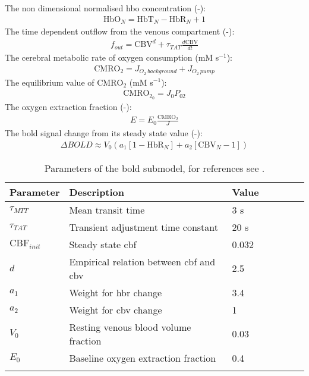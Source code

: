 \documentclass[11pt]{elsarticle}
\newcommand{\psec}{s$^{-1}$\xspace}
\begin{document}
The non dimensional normalised \gls{hbo} concentration (-):
\begin{align}
\text{HbO}_N = \text{HbT}_N - \text{HbR}_N + 1
\end{align}
%
The time dependent outflow from the venous compartment (-):
\begin{align}
f_{out} = \text{CBV}^{d} + \tau_{TAT} \frac{d \text{CBV}}{dt}
\end{align}
%	
The cerebral metabolic rate of oxygen consumption (mM \psec):
\begin{align}
\text{CMRO}_2 = J_{O_2 \: background} + J_{O_2 \: pump}
\end{align}
%	
The equilibrium value of $\text{CMRO}_2$ (mM \psec):
\begin{align}
\text{CMRO}_{2_0} =  J_0 P_{02}
\end{align}
%	
The oxygen extraction fraction (-):
\begin{align}
E = E_0\frac{\text{CMRO}_2}{J}
\end{align}
%
The \gls{bold} signal change from its steady state value (-):
\begin{align}
\Delta BOLD \approx V_0 \left( a_1 \left[ 1 - \text{HbR}_N \right] + a_2 \left[ \text{CBV}_N - 1 \right] \right) 
\label{eq:bold}
\end{align}
\xspace
%	
\begin{longtable}[h!]{ p{0.12\linewidth}   p{0.6\linewidth}   p{0.28\linewidth} }
	\hline
	Parameter & Description & Value \\
	\hline
	$\tau_{MTT}$ 		& Mean transit time											&  3 s		\\
	$\tau_{TAT}$ 				& Transient adjustment time constant						& 20 s		\\
	$ \text{CBF}_{init}$				& Steady state \gls{cbf}							& 0.032  	\\
	$d$					& Empirical relation between \gls{cbf} and \gls{cbv}					& 2.5		\\	
	$a_1$ 				& Weight for \gls{hbr} change											& 3.4		\\
	$a_2$ 				& Weight for \gls{cbv} change											& 1 		\\
	$V_0$				& Resting venous blood volume fraction 						& 0.03		\\
	$E_0$				& Baseline oxygen extraction fraction						& 0.4		\\
\hline
\caption{Parameters of the \gls{bold} submodel, for references see \citet{Mathias2017}.}
\end{longtable}
\end{document}
